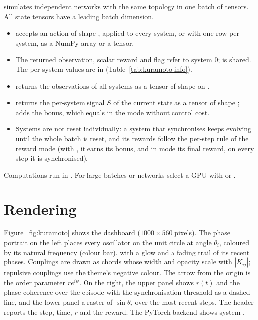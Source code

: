  simulates  independent
networks with the same topology in one batch of tensors. All state tensors have
a leading batch dimension.

\begin{itemize}
  \item {} accepts an action of shape ,
        applied to every system, or  with one row
        per system, as a NumPy array or a tensor.
  \item The returned observation, scalar reward and  flag
        refer to system 0;  is shared. The per-system values are
        in  (Table~\ref{tab:kuramoto-info}).
  \item {} returns the observations of all
        systems as a tensor of shape  on
        .
  \item {}
        returns the per-system signal $S$ of the current state as a tensor of
        shape ;  adds the bonus,
        which equals  in the  mode
        without control cost.
  \item Systems are not reset individually: a system that synchronises keeps
        evolving until the whole batch is reset, and its rewards follow the
        per-step rule of the reward mode (with , it
        earns its bonus, and in  mode its final reward, on
        every step it is synchronised).
\end{itemize}

Computations run in . For large batches or networks select a GPU
with  or .

\section{Rendering}\label{sec:kuramoto-render}

Figure~\ref{fig:kuramoto} shows the dashboard ($1000 \times 560$ pixels). The
phase portrait on the left places every oscillator on the unit circle at angle
$\theta_i$, coloured by its natural frequency (colour bar), with a glow and a
fading trail of its recent phases. Couplings are drawn as chords whose width
and opacity scale with $|K_{ij}|$; repulsive couplings use the theme's negative
colour. The arrow from the origin is the order parameter $r e^{i\psi}$. On the
right, the upper panel shows $r(t)$ and the phase coherence over the episode
with the synchronisation threshold as a dashed line, and the lower panel a
raster of $\sin\theta_i$ over the most recent steps. The header reports the
step, time, $r$ and the reward. The PyTorch backend shows system
.

